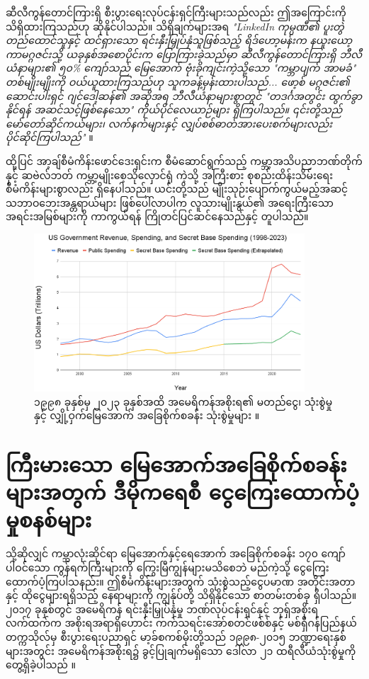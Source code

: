 \documentclass[10pt,twocolumn,letterpaper]{article}
\begin{document}
ဆီလီကွန်တောင်ကြားရှိ စီးပွားရေးလုပ်ငန်းရှင်ကြီးများသည်လည်း ဤအကြောင်းကို သိရှိထားကြသည်ဟု ဆိုနိုင်ပါသည်။ သိရှိချက်များအရ \textit{"LinkedIn ကုမ္ပဏီ၏ ပူးတွဲတည်ထောင်သူနှင့် ထင်ရှားသော ရင်းနှီးမြှုပ်နှံသူဖြစ်သည့် ရိဒ်ဟော့မန်းက နယူးယော့ကာမဂ္ဂဇင်းသို့ ယခုနှစ်အစောပိုင်းက ပြောကြားခဲ့သည်မှာ ဆီလီကွန်တောင်ကြားရှိ ဘီလီယံနာများ၏ ၅၀\% ကျော်သည် မြေအောက် ဗုံးခိုကျင်းကဲ့သို့သော "ကမ္ဘာပျက် အာမခံ" တစ်မျိုးမျိုးကို ဝယ်ယူထားကြသည်ဟု သူကခန့်မှန်းထားပါသည်... ဖော့စ် မဂ္ဂဇင်း၏ ဆောင်းပါးရှင် ဂျင်ဒေါ့ဆန်၏ အဆိုအရ ဘီလီယံနာများစွာတွင် "တဒင်္ဂအတွင်း ထွက်ခွာနိုင်ရန် အဆင်သင့်ဖြစ်နေသော" ကိုယ်ပိုင်လေယာဉ်များ ရှိကြပါသည်။ ၎င်းတို့သည် မော်တော်ဆိုင်ကယ်များ၊ လက်နက်များနှင့် လျှပ်စစ်ဓာတ်အားပေးစက်များလည်း ပိုင်ဆိုင်ကြပါသည်"} \cite{28}။

ထို့ပြင် အာ့ချ်စီမံကိန်းဖောင်ဒေးရှင်းက စီမံဆောင်ရွက်သည့် ကမ္ဘာ့အသိပညာဘဏ်တိုက်နှင့် ဆဗဲလ်ဘတ် ကမ္ဘာ့မျိုးစေ့သိုလှောင်ရုံ \cite{30} ကဲ့သို့ အကြီးစား စုစည်းထိန်းသိမ်းရေး စီမံကိန်းများစွာလည်း ရှိနေပါသည်။ ယင်းတို့သည် မျိုးသုဉ်းပျောက်ကွယ်မည့်အဆင့် သဘာဝဘေးအန္တရာယ်များ ဖြစ်ပေါ်လာပါက လူသားမျိုးနွယ်၏ အရေးကြီးသော အရင်းအမြစ်များကို ကာကွယ်ရန် ကြိုတင်ပြင်ဆင်နေသည်နှင့် တူပါသည်။
\begin{figure}[t]
\begin{center}
\includegraphics[width=0.9\textwidth]{govcrop2.png}
\end{center}
   \caption{၁၉၉၈ ခုနှစ်မှ ၂၀၂၃ ခုနှစ်အထိ အမေရိကန်အစိုးရ၏ မတည်ငွေ၊ သုံးစွဲမှုနှင့် လျှို့ဝှက်မြေအောက် အခြေစိုက်စခန်း သုံးစွဲမှုများ \cite{19}။}
   \label{fig:9}
\end{figure}
\section{ကြီးမားသော မြေအောက်အခြေစိုက်စခန်းများအတွက် ဒီမိုကရေစီ ငွေကြေးထောက်ပံ့မှုစနစ်များ}

သို့ဆိုလျှင် ကမ္ဘာလုံးဆိုင်ရာ မြေအောက်နှင့်ရေအောက် အခြေစိုက်စခန်း ၁၇၀ ကျော်ပါဝင်သော ကွန်ရက်ကြီးများကို ကြွေးမြီကျွန်များမသိစေဘဲ မည်ကဲ့သို့ ငွေကြေးထောက်ပံ့ကြပါသနည်း။ ဤစီမံကိန်းများအတွက် သုံးစွဲသည့်ငွေပမာဏ အတိုင်းအတာနှင့် ထိုငွေများရရှိသည့် နေရာများကို ကျွန်ုပ်တို့ သိရှိနိုင်သော စာတမ်းတစ်ခု ရှိပါသည်။ ၂၀၁၇ ခုနှစ်တွင် အမေရိကန် ရင်းနှီးမြှုပ်နှံမှု ဘဏ်လုပ်ငန်းရှင်နှင့် ဘုရှ်အစိုးရ လက်ထက်က အစိုးရအရာရှိဟောင်း ကက်သရင်းအော်စတင်ဖစ်စ်နှင့် မစ်ရှီဂန်ပြည်နယ် တက္ကသိုလ်မှ စီးပွားရေးပညာရှင် မာ့ခ်စကစ်မိုးတို့သည် ၁၉၉၈-၂၀၁၅ ဘဏ္ဍာရေးနှစ်များအတွင်း အမေရိကန်အစိုးရ၌ ခွင့်ပြုချက်မရှိသော ဒေါ်လာ ၂၁ ထရီလီယံသုံးစွဲမှုကို တွေ့ရှိခဲ့ပါသည် \cite{11,12,13}။
\end{document}
